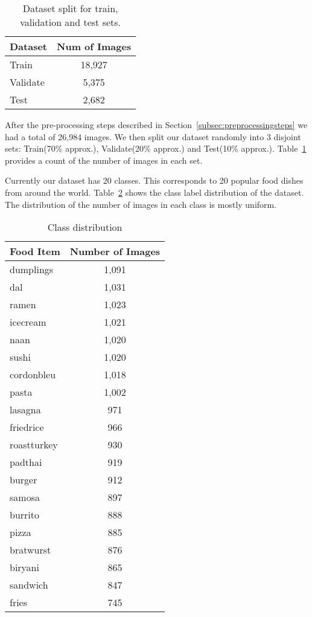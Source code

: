 \begin{table}
\begin{center}
\begin{tabular}{|l|c|}
\hline
Dataset & Num of Images \\
\hline
Train & 18,927 \\
Validate & 5,375 \\
Test & 2,682 \\
\hline
\end{tabular}
\end{center}
\caption{Dataset split for train, validation and test sets.}
\label{table:datasplitdetails}
\end{table}

After the pre-processing steps described in Section~\ref{subsec:preprocessingsteps} we had a total of 26,984 images. We then split our dataset randomly into 3 disjoint sets: Train(70\% approx.), Validate(20\% approx.) and Test(10\% approx.). Table~\ref{table:datasplitdetails} provides a count of the number of images in each set.

Currently our dataset has 20 classes.  This corresponds to 20 popular food dishes from around the world. Table~\ref{table:classdistribution} shows the class label distribution of the dataset. The distribution of the number of images in each class is mostly uniform. 

\begin{table}
\begin{center}
\begin{tabular}{|l|c|}
\hline
Food Item & Number of Images \\
\hline\hline
dumplings & 1,091\\
dal & 1,031\\
ramen & 1,023\\
icecream & 1,021\\
naan & 1,020\\
sushi & 1,020\\
cordonbleu & 1,018\\
pasta & 1,002\\
lasagna & 971\\
friedrice & 966\\
roastturkey & 930\\
padthai & 919\\
burger & 912\\
samosa & 897\\
burrito & 888\\
pizza & 885\\
bratwurst & 876\\
biryani & 865\\
sandwich & 847\\
fries & 745\\
\hline
\end{tabular}
\end{center}
\caption{Class distribution}
\label{table:classdistribution}
\end{table}


